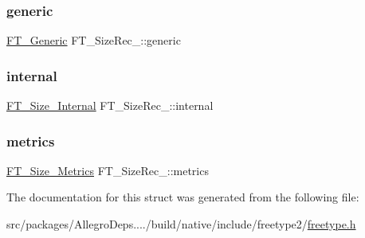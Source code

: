 \mbox{\label{struct_f_t___size_rec___aa24520b093a9b4ba9ff388bfe7b9491d}} 
\subsubsection{\texorpdfstring{generic}{generic}}
{\footnotesize\ttfamily \hyperlink{fttypes_8h_ae15e8550dd7d863328686aadaead5c77}{F\+T\+\_\+\+Generic} F\+T\+\_\+\+Size\+Rec\+\_\+\+::generic}

\mbox{\label{struct_f_t___size_rec___a236c47ea3138e485c29b0d7baa5cf3b6}} 
\subsubsection{\texorpdfstring{internal}{internal}}
{\footnotesize\ttfamily \hyperlink{freetype_8h_a59c5fa003a18285aab769cb96252499c}{F\+T\+\_\+\+Size\+\_\+\+Internal} F\+T\+\_\+\+Size\+Rec\+\_\+\+::internal}

\mbox{\label{struct_f_t___size_rec___a29a6b518d09f6cf1714d9aed01eddc01}} 
\subsubsection{\texorpdfstring{metrics}{metrics}}
{\footnotesize\ttfamily \hyperlink{freetype_8h_a8b7a8201f8d155cac76cfb03302c2672}{F\+T\+\_\+\+Size\+\_\+\+Metrics} F\+T\+\_\+\+Size\+Rec\+\_\+\+::metrics}



The documentation for this struct was generated from the following file\+:\begin{DoxyCompactItemize}
\item 
src/packages/\+Allegro\+Deps..../build/native/include/freetype2/\hyperlink{freetype_8h}{freetype.\+h}\end{DoxyCompactItemize}
